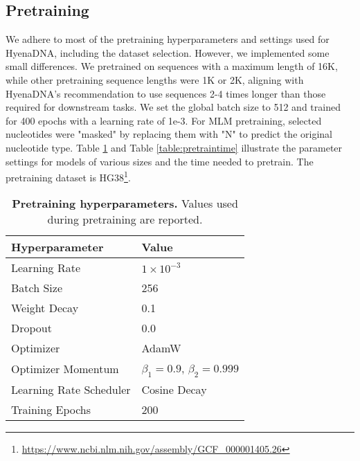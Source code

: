 \subsection{Pretraining}\label{app:pretrain}
We adhere to most of the pretraining hyperparameters and settings used for HyenaDNA, including the dataset selection. However, we implemented some small differences. We pretrained on sequences with a maximum length of 16K, while other pretraining sequence lengths were 1K or 2K, aligning with HyenaDNA's recommendation to use sequences 2-4 times longer than those required for downstream tasks. We set the global batch size to 512 and trained for 400 epochs with a learning rate of 1e-3. For MLM pretraining, selected nucleotides were "masked" by replacing them with "N" to predict the original nucleotide type. Table \ref{table:pretrain} and Table \ref{table:pretraintime} illustrate the parameter settings for models of various sizes and the time needed to pretrain. The pretraining dataset is HG38\footnote{\url{https://www.ncbi.nlm.nih.gov/assembly/GCF_000001405.26}}.
\begin{table}[h]
\centering
\caption{\textbf{Pretraining hyperparameters.} Values used during pretraining are reported.}
\label{table:pretrain}
\begin{tabular}{@{}ll@{}}
\toprule
\textbf{Hyperparameter}      & \textbf{Value}                         \\ \midrule
Learning Rate                & $1 \times 10^{-3}$                     \\
Batch Size                   & 256                                    \\
Weight Decay                 & 0.1                                    \\
Dropout                      & 0.0                                    \\ \midrule
Optimizer                    & AdamW                                  \\
Optimizer Momentum           & $\beta_1 = 0.9$, $\beta_2 = 0.999$     \\
Learning Rate Scheduler      & Cosine Decay                           \\
Training Epochs              & 200                                    \\ \bottomrule
\end{tabular}
\end{table}


